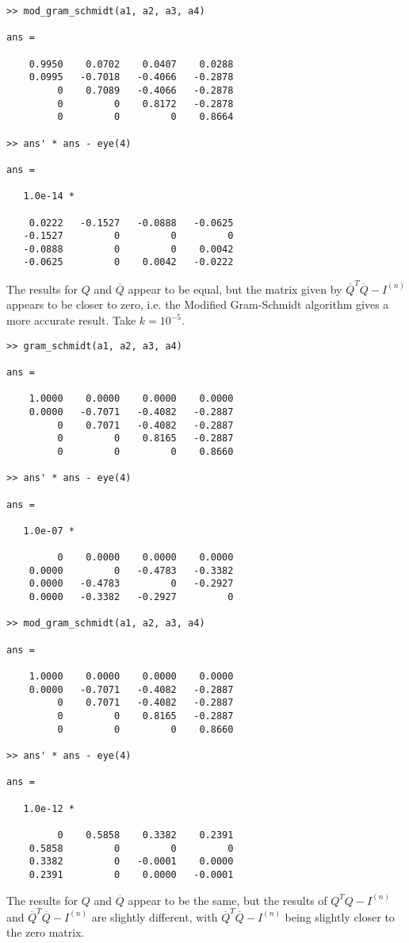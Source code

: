 \documentclass{article}
\begin{document}
\begin{enumerate}
\begin{enumerate}
\begin{verbatim}
>> mod_gram_schmidt(a1, a2, a3, a4)

ans =

    0.9950    0.0702    0.0407    0.0288
    0.0995   -0.7018   -0.4066   -0.2878
         0    0.7089   -0.4066   -0.2878
         0         0    0.8172   -0.2878
         0         0         0    0.8664
         
>> ans' * ans - eye(4)

ans =

   1.0e-14 *

    0.0222   -0.1527   -0.0888   -0.0625
   -0.1527         0         0         0
   -0.0888         0         0    0.0042
   -0.0625         0    0.0042   -0.0222
		\end{verbatim}
		The results for $Q$ and $\overline{Q}$ appear to be equal, but the matrix given by $\overline{Q}^T\overline{Q} - I^{(n)}$ appears to be closer to zero, i.e. the Modified Gram-Schmidt algorithm gives a more accurate result.
		\newpage
		Take $k = 10^{-5}$.
		\begin{verbatim}
>> gram_schmidt(a1, a2, a3, a4)

ans =

    1.0000    0.0000    0.0000    0.0000
    0.0000   -0.7071   -0.4082   -0.2887
         0    0.7071   -0.4082   -0.2887
         0         0    0.8165   -0.2887
         0         0         0    0.8660      

>> ans' * ans - eye(4)

ans =

   1.0e-07 *

         0    0.0000    0.0000    0.0000
    0.0000         0   -0.4783   -0.3382
    0.0000   -0.4783         0   -0.2927
    0.0000   -0.3382   -0.2927         0

>> mod_gram_schmidt(a1, a2, a3, a4)

ans =

    1.0000    0.0000    0.0000    0.0000
    0.0000   -0.7071   -0.4082   -0.2887
         0    0.7071   -0.4082   -0.2887
         0         0    0.8165   -0.2887
         0         0         0    0.8660
         
>> ans' * ans - eye(4)

ans =

   1.0e-12 *

         0    0.5858    0.3382    0.2391
    0.5858         0         0         0
    0.3382         0   -0.0001    0.0000
    0.2391         0    0.0000   -0.0001	
		\end{verbatim}
		The results for $Q$ and $\overline{Q}$ appear to be the same, but the results of $Q^TQ - I^{(n)}$ and $\overline{Q}^T\overline{Q} - I^{(n)}$ are slightly different, with $\overline{Q}^T\overline{Q} - I^{(n)}$ being slightly closer to the zero matrix.
		

\end{enumerate}
\end{enumerate}
\end{document}
